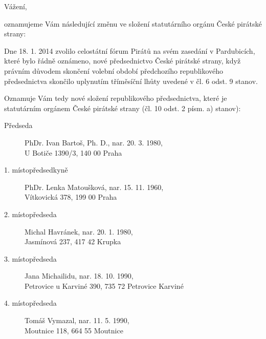 \documentclass[11pt,a4paper,czech]{article}
\begin{document}


\def \yoursign {č. j. MV-39553-7/VS-2009}
\def \yourdate {}
\def \oursign {RP 1/2014}
\def \place {Praha}

\vspace*{0.5cm}
\printheader

\subject{Změna členů statutárního orgánu}

Vážení,

oznamujeme Vám následující změnu ve složení statutárního orgánu České pirátské strany:

Dne 18. 1. 2014 zvolilo celostátní fórum Pirátů na svém zasedání v Pardubicích, které bylo řádně oznámeno, nové předsednictvo České pirátské strany, když právním důvodem skončení volební období předchozího republikového předsednictva skončilo uplynutím tříměsíční lhůty uvedené v čl. 6 odst. 9 stanov. 

Oznamuje Vám tedy nové složení republikového předsednictva, které je statutárním orgánem České pirátské strany (čl. 10 odst. 2 písm. a) stanov):

\begin{description}
\item[Předseda]{PhDr. Ivan Bartoš, Ph. D., nar. 20. 3. 1980, \\ U Botiče 1390/3, 140 00 Praha}
\item[1. místopředsedkyně]{PhDr. Lenka Matoušková, nar. 15. 11. 1960, \\ Vítkovická 378, 199 00 Praha}
\item[2. místopředseda]{Michal Havránek, nar. 20. 1. 1980, \\ Jasmínová 237, 417 42 Krupka}
\item[3. místopředseda]{Jana Michailidu, nar. 18. 10. 1990, \\ Petrovice u Karviné 390, 735 72 Petrovice Karviné}
\item[4. místopředseda]{Tomáš Vymazal, nar. 11. 5. 1990, \\ Moutnice 118, 664 55 Moutnice}
\end{description}
\end{document}
